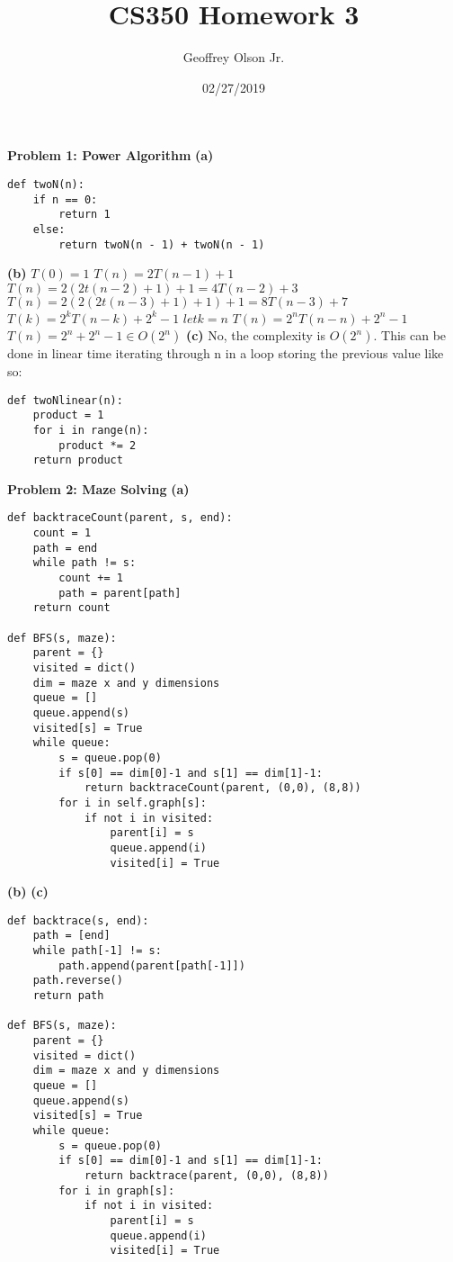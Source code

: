 \documentclass[12pt]{article}
\title{CS350 Homework 3}
\author{Geoffrey Olson Jr.}
\date{02/27/2019}
\begin{document}
\maketitle
\textbf{Problem 1: Power Algorithm}
\newline
\textbf{(a)}
\begin{lstlisting}
def twoN(n):
    if n == 0:
        return 1
    else:
        return twoN(n - 1) + twoN(n - 1)
\end{lstlisting}
\textbf{(b)}
\newline
$T(0) = 1$\newline
$T(n) = 2T(n-1) + 1$
\newline
$T(n) = 2(2t(n-2)+1)+1 = 4T(n-2)+3$\newline
$T(n) = 2(2(2t(n-3)+1)+1)+1 = 8T(n-3)+7$\newline
$T(k) = 2^kT(n-k)+2^k-1$\newline
$let k = n$\newline
$T(n) = 2^{n}T(n-n)+2^n-1$\newline
$T(n) = 2^n+2^n-1\in O(2^n)$\newline\newline
\textbf{(c)}
No, the complexity is $O(2^n)$. This can be done in linear time iterating through n in a loop storing the previous value like so:
\begin{lstlisting}
def twoNlinear(n):
    product = 1
    for i in range(n):
        product *= 2
    return product
\end{lstlisting}
\textbf{Problem 2: Maze Solving}
\newline
\textbf{(a)}
\begin{lstlisting}
def backtraceCount(parent, s, end):
    count = 1
    path = end
    while path != s:
        count += 1
        path = parent[path]
    return count

def BFS(s, maze):
    parent = {}
    visited = dict()
    dim = maze x and y dimensions
    queue = []
    queue.append(s)
    visited[s] = True
    while queue:
        s = queue.pop(0)
        if s[0] == dim[0]-1 and s[1] == dim[1]-1:
            return backtraceCount(parent, (0,0), (8,8))
        for i in self.graph[s]:
            if not i in visited:
                parent[i] = s
                queue.append(i)
                visited[i] = True
\end{lstlisting}
\textbf{(b)}
\newline
\textbf{(c)}
\begin{lstlisting}
def backtrace(s, end):
    path = [end]
    while path[-1] != s:
        path.append(parent[path[-1]])
    path.reverse()
    return path

def BFS(s, maze):
    parent = {}
    visited = dict()
    dim = maze x and y dimensions
    queue = []
    queue.append(s)
    visited[s] = True
    while queue:
        s = queue.pop(0)
        if s[0] == dim[0]-1 and s[1] == dim[1]-1:
            return backtrace(parent, (0,0), (8,8))
        for i in graph[s]:
            if not i in visited:
                parent[i] = s
                queue.append(i)
                visited[i] = True
\end{lstlisting}
\end{document}
